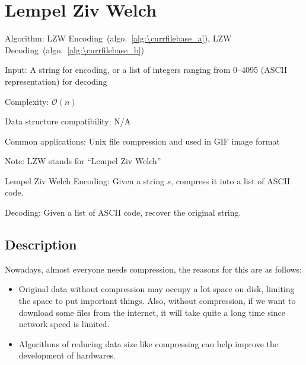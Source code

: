 \documentclass[catalog.tex]{subfiles}
\begin{document}
%
%

\def\pbname{Lempel Ziv Welch} %

\section{\pbname} 

\begin{overview}
\item [Algorithm:] LZW Encoding~(algo.~\ref{alg:\currfilebase_a}), LZW Decoding~(algo.~\ref{alg:\currfilebase_b})
\item [Input:] A string for encoding, or a list of integers ranging from 0--4095 (ASCII representation) for decoding
\item [Complexity:] $\mathcal{O}(n)$
\item [Data structure compatibility:] N/A
\item [Common applications:] Unix file compression and used in GIF image format
\item [Note:] LZW stands for ``Lempel Ziv Welch''
\end{overview}


\begin{problem}{\pbname}
	Encoding: Given a string $s$, compress it into a list of ASCII code.
	
	Decoding: Given a list of ASCII code, recover the original string.
\end{problem}


\subsection*{Description}
Nowadays, almost everyone needs compression, the reasons for this are as follows:
\begin{itemize}
    \item Original data without compression may occupy a lot space on disk, limiting the space to put important things. Also, without compression, if we want to download some files from the internet, it will take quite a long time since network speed is limited.
    \item Algorithms of reducing data size like compressing can help improve the development of hardwares.
\end{itemize}
\end{document}
